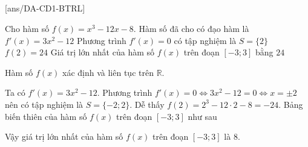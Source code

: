 \subsection{\btrl}
[ans/DA-CD1-BTRL]
\begin{ex}[TN2025-0101]%
    Cho hàm số $f(x)=x^3-12x-8$.
    \choiceTF
    {\True Hàm số đã cho có đạo hàm là $f'(x)=3x^2-12$}
    {Phương trình $f'(x)=0$ có tập nghiệm là $S=\{2\}$}
    {$f(2)=24$}
    {Giá trị lớn nhất của hàm số $f(x)$ trên đoạn $[-3;3]$ bằng $24$}
    \loigiai
    {Hàm số $f(x)$ xác định và liên tục trên $\mathbb{R}$.
        \begin{itemchoice}
            \itemch Ta có $f'(x)=3x^2-12$.
            \itemch Phương trình $f'(x)=0 \Leftrightarrow 3x^2-12=0 \Leftrightarrow x=\pm 2$ nên có tập nghiệm là $S=\{-2;2\}$.
            \itemch Dễ thấy $f(2)=2^3-12\cdot 2-8 =-24$.
            \itemch	Bảng biến thiên của hàm số $f(x)$ trên đoạn $[-3;3]$ như sau
            \begin{center}
            \end{center}
            Vậy giá trị lớn nhất của hàm số $f(x)$ trên đoạn $[-3;3]$ là $8$.
    \end{itemchoice}}
\end{ex}
